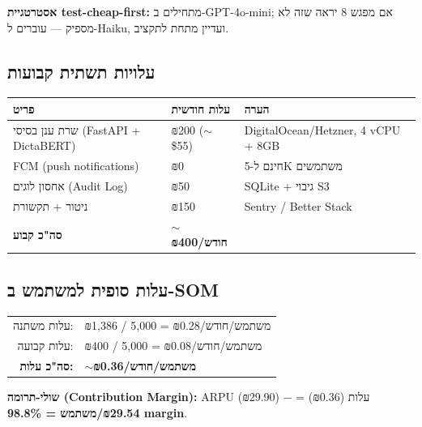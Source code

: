 \documentclass[11pt]{article}
\newcommand{\en}[1]{\textenglish{#1}}
\begin{document}
\textbf{אסטרטגיית \en{test-cheap-first}:} מתחילים ב-\en{GPT-4o-mini}; אם מפגש 8 יראה שזה לא מספיק — עוברים ל-\en{Haiku}, ועדיין מתחת לתקציב.

\subsection*{עלויות תשתית קבועות}

\begin{longtable}{|>{\raggedright\arraybackslash}p{6.0cm}|>{\raggedright\arraybackslash}p{3.0cm}|>{\raggedright\arraybackslash}p{5.0cm}|}
\hline
\rowcolor{hdr}
\textbf{פריט} & \textbf{עלות חודשית} & \textbf{הערה} \\
\hline
\endhead
שרת ענן בסיסי (\en{FastAPI + DictaBERT}) & ₪\en{200} ($\sim$\en{\$55}) & \en{DigitalOcean/Hetzner}, \en{4 vCPU + 8GB} \\ \hline
\rowcolor{ltgray}
\en{FCM} (\en{push notifications}) & ₪\en{0} & חינם ל-\en{5K} משתמשים \\ \hline
אחסון לוגים (\en{Audit Log}) & ₪\en{50} & \en{SQLite} + גיבוי \en{S3} \\ \hline
\rowcolor{ltgray}
ניטור + תקשורת & ₪\en{150} & \en{Sentry / Better Stack} \\ \hline
\textbf{סה"כ קבוע} & \textbf{$\sim$₪\en{400}/חודש} & \\ \hline
\end{longtable}

\subsection*{עלות סופית למשתמש ב-\en{SOM}}

\begin{center}
\begin{tabular}{rl}
עלות משתנה: & ₪\en{1,386} / \en{5,000} = ₪\en{0.28}/משתמש/חודש \\
עלות קבועה: & ₪\en{400} / \en{5,000} = ₪\en{0.08}/משתמש/חודש \\
\hline
\textbf{סה"כ עלות:} & \textbf{$\sim$₪\en{0.36}/משתמש/חודש} \\
\end{tabular}
\end{center}

\textbf{שולי-תרומה (\en{Contribution Margin}):} \en{ARPU} (₪\en{29.90}) $-$ עלות (₪\en{0.36}) = \textbf{₪\en{29.54}/משתמש = \en{98.8\%} \en{margin}}.

\end{document}
